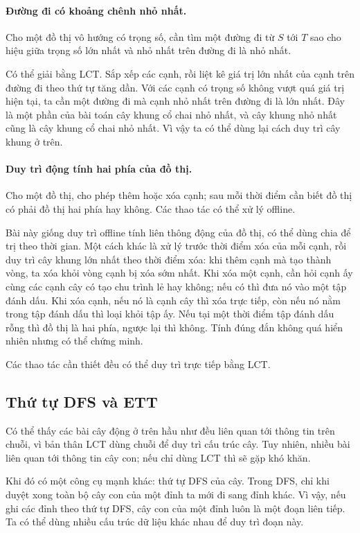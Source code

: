 \documentclass[11pt]{article}
\begin{document}
\paragraph{Đường đi có khoảng chênh nhỏ nhất.}
Cho một đồ thị vô hướng có trọng số, cần tìm một đường đi từ \(S\) tới \(T\) sao
cho hiệu giữa trọng số lớn nhất và nhỏ nhất trên đường đi là nhỏ nhất.

Có thể giải bằng LCT. Sắp xếp các cạnh, rồi liệt kê giá trị lớn nhất của cạnh
trên đường đi theo thứ tự tăng dần. Với các cạnh có trọng số không vượt quá giá
trị hiện tại, ta cần một đường đi mà cạnh nhỏ nhất trên đường đi là lớn nhất.
Đây là một phần của bài toán cây khung cổ chai nhỏ nhất, và cây khung nhỏ nhất
cũng là cây khung cổ chai nhỏ nhất. Vì vậy ta có thể dùng lại cách duy trì cây
khung ở trên.

\paragraph{Duy trì động tính hai phía của đồ thị.}
Cho một đồ thị, cho phép thêm hoặc xóa cạnh; sau mỗi thời điểm cần biết đồ thị có
phải đồ thị hai phía hay không. Các thao tác có thể xử lý offline.

Bài này giống duy trì offline tính liên thông động của đồ thị, có thể dùng chia
để trị theo thời gian. Một cách khác là xử lý trước thời điểm xóa của mỗi cạnh,
rồi duy trì cây khung lớn nhất theo thời điểm xóa: khi thêm cạnh mà tạo thành
vòng, ta xóa khỏi vòng cạnh bị xóa sớm nhất. Khi xóa một cạnh, cần hỏi cạnh ấy
cùng các cạnh cây có tạo chu trình lẻ hay không; nếu có thì đưa nó vào một tập
đánh dấu. Khi xóa cạnh, nếu nó là cạnh cây thì xóa trực tiếp, còn nếu nó nằm
trong tập đánh dấu thì loại khỏi tập ấy. Nếu tại một thời điểm tập đánh dấu rỗng
thì đồ thị là hai phía, ngược lại thì không. Tính đúng đắn không quá hiển nhiên
nhưng có thể chứng minh.

Các thao tác cần thiết đều có thể duy trì trực tiếp bằng LCT.

\subsection{Thứ tự DFS và ETT}

Có thể thấy các bài cây động ở trên hầu như đều liên quan tới thông tin trên
chuỗi, vì bản thân LCT dùng chuỗi để duy trì cấu trúc cây. Tuy nhiên, nhiều bài
liên quan tới thông tin cây con; nếu chỉ dùng LCT thì sẽ gặp khó khăn.

Khi đó có một công cụ mạnh khác: thứ tự DFS của cây. Trong DFS, chỉ khi duyệt
xong toàn bộ cây con của một đỉnh ta mới đi sang đỉnh khác. Vì vậy, nếu ghi các
đỉnh theo thứ tự DFS, cây con của một đỉnh luôn là một đoạn liên tiếp. Ta có thể
dùng nhiều cấu trúc dữ liệu khác nhau để duy trì đoạn này.
\end{document}
